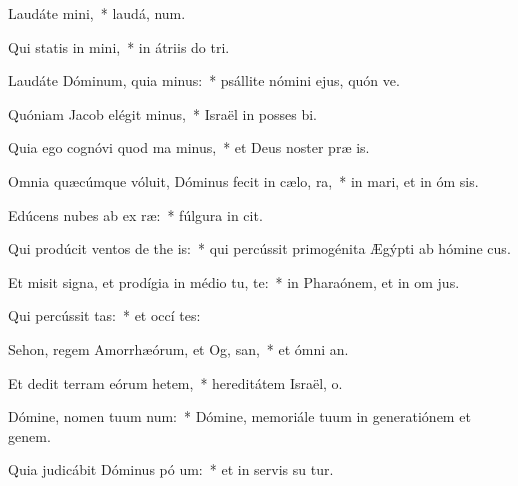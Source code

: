 \item Laudáte  mini,~* laudá,  num.
\item Qui statis in  mini,~* in átriis do  tri.
\item Laudáte Dóminum, quia  minus:~* psállite nómini ejus, quón ve.
\item Quóniam Jacob elégit  minus,~* Israël in posses bi.
\item Quia ego cognóvi quod ma  minus,~* et Deus noster præ  is.
\item Omnia quæcúmque vóluit, Dóminus fecit in cælo,   ra,~* in mari, et in óm sis.
\item Edúcens nubes ab ex ræ:~* fúlgura in  cit.
\item Qui prodúcit ventos de the is:~* qui percússit primogénita Ægýpti ab hómine   cus.
\item Et misit signa, et prodígia in médio tu, te:~* in Pharaónem, et in om  jus.
\item Qui percússit  tas:~* et occí  tes:
\item Sehon, regem Amorrhæórum, et Og,  san,~* et ómni  an.
\item Et dedit terram eórum hetem,~* hereditátem Israël,  o.
\item Dómine, nomen tuum  num:~* Dómine, memoriále tuum in generatiónem et genem.
\item Quia judicábit Dóminus pó um:~* et in servis su tur.

